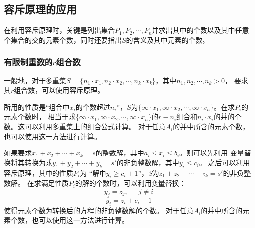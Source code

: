 \documentclass[a4paper,11pt]{article}%
\theoremstyle{remark}
\theoremstyle{remark}
\theoremstyle{definition}
\theoremstyle{definition}
\theoremstyle{definition}
\begin{document}
\subsection{容斥原理的应用}
在利用容斥原理时，关键是列出集合$P_1,P_2,\cdots,P_n$并求出其中的个数以及其中任意个集合的交的元素个数，同时还要指出$S$的含义及其中元素的个数。
\subsubsection{有限制重数的$r$组合数}
一般地，对于多重集$S=\{n_1\cdot x_1,n_2\cdot x_2,\cdots,n_k\cdot x_k\}$，其中$n_1,n_2,\cdots,n_k>0$，
要求其$r$组合数，可以使用容斥原理。

所用的性质是“组合中$x_i$的个数超过$n_i$”，$S$为$\{\infty\cdot x_1,\infty\cdot x_2,\cdots,\infty\cdot x_n\}$。在求$P_i$的元素个数时，
相当于求$\{\infty\cdot x_1,\infty\cdot x_2,\cdots,\infty\cdot x_n\}$的$r-n_i$组合和${n_i\cdot x_i}$的并的个数。这可以利用多重集上的组合公式计算。
对于任意$A_i$的并中所含的元素个数，也可以使用这一方法进行计算。

如果要求$x_1+x_2+\cdots +x_k=s$的整数解，其中$a_i\leq x_i\leq b_i$。则可以先利用
变量替换将其转换为求$y_1+y_2+\cdots +y_k=s'$的非负整数解，其中$y_i\leq c_i$。
之后可以利用容斥原理，其中的性质$P_i$为 “解中$y_i \geq c_i+1$”，$S$为$z_1+z_2+\cdots +z_k=s'$的非负整数解。 
在求满足性质$P_i$的解的个数时，可以利用变量替换：
\[y_j=z_j,\phantom{222}j\neq i\]
\[y_i=z_i+c_i+1\]
使得元素个数为转换后的方程的非负整数解的个数。
对于任意$A_i$的并中所含的元素个数，也可以使用这一方法进行计算。
\end{document}
